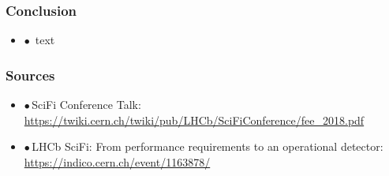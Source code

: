 \documentclass[aspectratio=1610, 12pt]{beamer}
\begin{document}
%



\begin{frame}\frametitle{Conclusion}
  \begin{itemize}
    \item $\bullet$\, text
  \end{itemize}
\end{frame}

\begin{frame}\frametitle{Sources}
  \begin{itemize}
    \item $\bullet$\,SciFi Conference Talk: \url{https://twiki.cern.ch/twiki/pub/LHCb/SciFiConference/fee_2018.pdf}
    \item $\bullet$\,LHCb SciFi: From performance requirements to an operational detector: \url{https://indico.cern.ch/event/1163878/}
  \end{itemize}
\end{frame}
\end{document}
